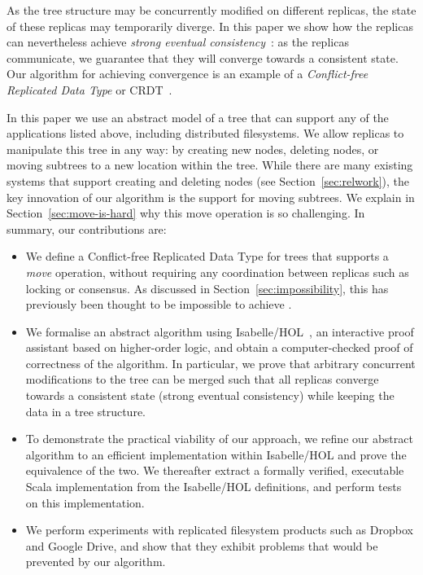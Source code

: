 \documentclass[sigconf]{acmart}
\begin{document}
As the tree structure may be concurrently modified on different replicas, the state of these replicas may temporarily diverge.
In this paper we show how the replicas can nevertheless achieve \emph{strong eventual consistency}~\cite{Shapiro:2011un,Gomes:2017gy}: as the replicas communicate, we guarantee that they will converge towards a consistent state.
Our algorithm for achieving convergence is an example of a \emph{Conflict-free Replicated Data Type} or CRDT~\cite{Shapiro:2011wy,Shapiro:2011un}.

In this paper we use an abstract model of a tree that can support any of the applications listed above, including distributed filesystems.
We allow replicas to manipulate this tree in any way: by creating new nodes, deleting nodes, or moving subtrees to a new location within the tree.
While there are many existing systems that support creating and deleting nodes (see Section~\ref{sec:relwork}), the key innovation of our algorithm is the support for moving subtrees.
We explain in Section~\ref{sec:move-is-hard} why this move operation is so challenging.
In summary, our contributions are:
\begin{itemize}
    \item We define a Conflict-free Replicated Data Type for trees that supports a \emph{move} operation, without requiring any coordination between replicas such as locking or consensus.
        As discussed in Section~\ref{sec:impossibility}, this has previously been thought to be impossible to achieve \cite{Najafzadeh:2017vk,Najafzadeh:2018bw}.
    \item We formalise an abstract algorithm using Isabelle/HOL~\cite{DBLP:conf/tphol/WenzelPN08}, an interactive proof assistant based on higher-order logic, and obtain a computer-checked proof of correctness of the algorithm.
        In particular, we prove that arbitrary concurrent modifications to the tree can be merged such that all replicas converge towards a consistent state (strong eventual consistency) while keeping the data in a tree structure.
    \item To demonstrate the practical viability of our approach, we refine our abstract algorithm to an efficient implementation within Isabelle/HOL and prove the equivalence of the two.  We thereafter extract a formally verified, executable Scala implementation from the Isabelle/HOL definitions, and perform tests on this implementation.
    \item We perform experiments with replicated filesystem products such as Dropbox and Google Drive, and show that they exhibit problems that would be prevented by our algorithm.
\end{itemize}
\end{document}
